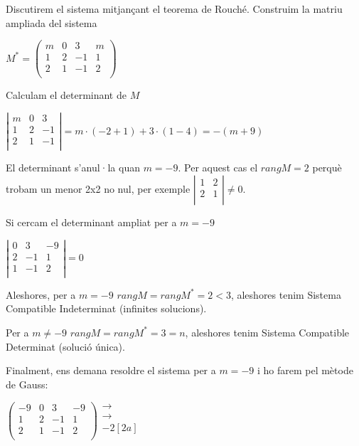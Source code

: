 \documentclass{article}
\begin{document}
	
Discutirem el sistema mitjançant el teorema de Rouché. Construim la matriu ampliada del sistema

$
M^* = \left(
\begin{array}{ccc|c}
	m & 0  & 3 & m \\
	1 & 2 & -1 & 1 \\
	2 & 1 & -1 & 2 \\ 
\end{array}
\right)
$

Calculam el determinant de $M$

$
\left|
\begin{array}{ccc}
m & 0  & 3 \\
1 & 2 & -1 \\
2 & 1 & -1  \\ 
\end{array}
\right| = m \cdot(-2+1)+3\cdot (1-4) = -(m+9)
$

El determinant s'anul·la quan $m=-9$. Per aquest cas el $rang M=2$ perquè trobam un menor 2x2 no nul, per exemple $\left|
\begin{array}{cc}
1 & 2  \\
2 & 1  \\ 
\end{array}
\right| \neq 0$.

Si cercam el determinant ampliat per a $m=-9$ 

$
\left|
\begin{array}{ccc}
0 & 3  & -9 \\
2 & -1 & 1 \\
1 & -1 & 2 \\ 
\end{array}
\right|=0
$

Aleshores, per a $m=-9$ $rang M=rang M^* =2 < 3$, aleshores tenim Sistema Compatible Indeterminat (infinites solucions).

Per a $m \neq -9$ $rang M=rang M^* =3 = n$, aleshores tenim Sistema Compatible Determinat (solució única).
 
Finalment, ens demana resoldre el sistema per a $m=-9$ i ho farem pel mètode de Gauss:

$
\left(
\begin{array}{ccc|c}
-9 & 0  & 3 & -9 \\
1 & 2 & -1 & 1 \\
2 & 1 & -1 & 2 \\ 
\end{array}
\right)

\begin{array}{l}
\rightarrow \\
\rightarrow \\
[3a]-2[2a] \\ 
\end{array}
$
 
\end{document}

